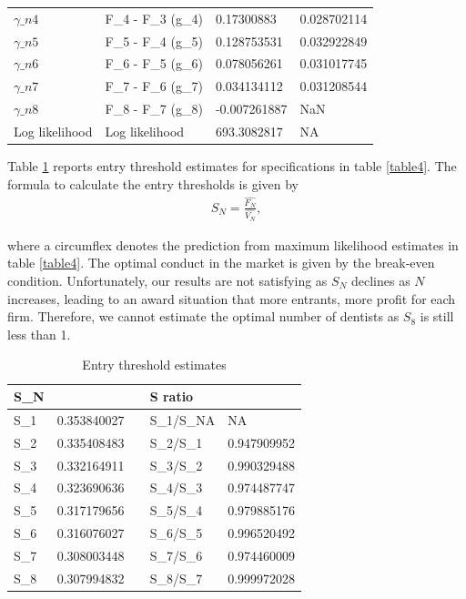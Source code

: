 \documentclass[a4paper,11pt]{article}
\begin{document}
\begin{table}[]
{\begin{tabular}{@{}llll@{}}
$\gamma\_n4$      & F\_4 - F\_3 (g\_4)                                                            & 0.17300883   & 0.028702114 \\
$\gamma\_n5$      & F\_5 - F\_4 (g\_5)                                                            & 0.128753531  & 0.032922849 \\
$\gamma\_n6$      & F\_6 - F\_5 (g\_6)                                                            & 0.078056261  & 0.031017745 \\
$\gamma\_n7$      & F\_7 - F\_6 (g\_7)                                                            & 0.034134112  & 0.031208544 \\
$\gamma\_n8$      & F\_8 - F\_7 (g\_8)                                                            & -0.007261887 & NaN         \\
Log likelihood & Log likelihood                                                                & 693.3082817  & NA          \\ \bottomrule
\end{tabular}}
\end{table}

Table \ref{table5} reports entry threshold estimates for specifications in table \ref{table4}. The formula to calculate the entry thresholds is given by
\begin{align}
    S_N=\frac{\hat{F_N}}{\hat{V_N}},
\end{align}

where a circumflex denotes the prediction from maximum likelihood estimates in table \ref{table4}. The optimal conduct in the market is given by the break-even condition. Unfortunately, our results are not satisfying as $S_N$ declines as $N$ increases, leading to an award situation that more entrants, more profit for each firm. Therefore, we cannot estimate the optimal number of dentists as $S_8$ is still less than 1. 

\begin{table}[ht]
\centering
\setlength{\belowcaptionskip}{0.2cm}
\caption{Entry threshold estimates}
\label{table5}
\begin{tabular}{@{}lllll@{}}
\toprule
S\_N &             &  & S ratio    &             \\ \midrule
S\_1 & 0.353840027 &  & S\_1/S\_NA & NA          \\
S\_2 & 0.335408483 &  & S\_2/S\_1  & 0.947909952 \\
S\_3 & 0.332164911 &  & S\_3/S\_2  & 0.990329488 \\
S\_4 & 0.323690636 &  & S\_4/S\_3  & 0.974487747 \\
S\_5 & 0.317179656 &  & S\_5/S\_4  & 0.979885176 \\
S\_6 & 0.316076027 &  & S\_6/S\_5  & 0.996520492 \\
S\_7 & 0.308003448 &  & S\_7/S\_6  & 0.974460009 \\
S\_8 & 0.307994832 &  & S\_8/S\_7  & 0.999972028 \\ \bottomrule
\end{tabular}
\end{table}
\end{document}
